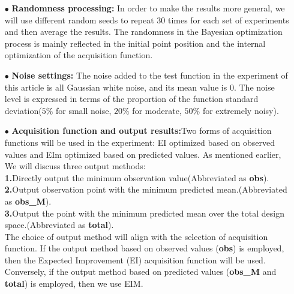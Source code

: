 \documentclass{article}
\begin{document}
\begin{itemize}[itemsep=2pt,topsep=0pt,parsep=0pt]
\item[$\bullet$] \textbf{Randomness processing:} In order to make the results more general, we will use different random seeds to repeat 30 times for each set of experiments and then average the results. The randomness in the Bayesian optimization process is mainly reflected in the initial point position and the internal optimization of the acquisition function.
\item[$\bullet$] \textbf{Noise settings:} The noise added to the test function in the experiment of this article is all Gaussian white noise, and its mean value is 0. The noise level is expressed in terms of the proportion of the function standard deviation($5\%$ for small noise, $20\%$ for moderate, $50\%$ for extremely noisy).
\item[$\bullet$] \textbf{Acquisition function and output results:}Two forms of acquisition functions will be used in the experiment: EI optimized based on observed values and EIm optimized based on predicted values. As mentioned earlier, We will discuss three output methods: \\
\textbf{1.}Directly output the minimum observation value(Abbreviated as \textbf{obs}).\\
\textbf{2.}Output observation point with the minimum predicted mean.(Abbreviated as \textbf{obs\_M}).\\
\textbf{3.}Output the point with the minimum predicted mean over the total design space.(Abbreviated as \textbf{total}).\\
The choice of output method will align with the selection of acquisition function. If the output method based on observed values (\textbf{obs}) is employed, then the Expected Improvement (EI) acquisition function will be used. Conversely, if the output method based on predicted values (\textbf{obs\_M} and \textbf{total}) is employed, then we use EIM.

\end{itemize}
\end{document}
